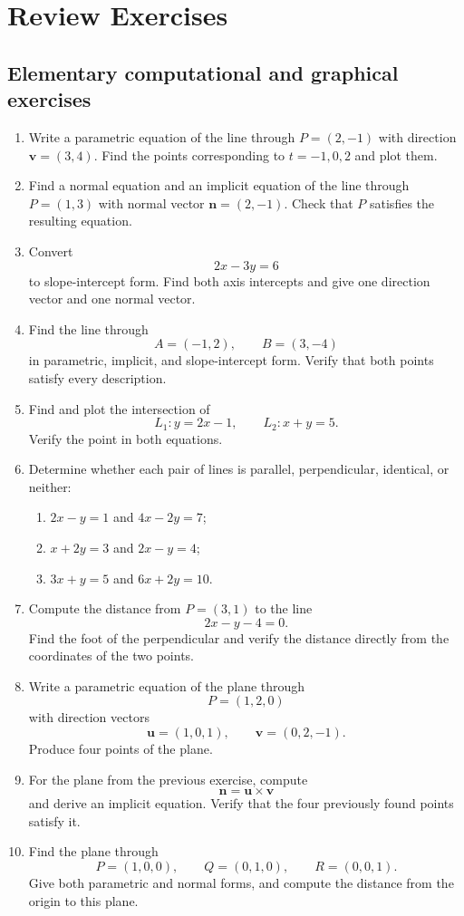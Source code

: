 \section{Review Exercises}

\subsection{Elementary computational and graphical exercises}

\begin{enumerate}

\item Write a parametric equation of the line through $P=(2,-1)$ with direction
$\mathbf v=(3,4)$. Find the points corresponding to $t=-1,0,2$ and plot them.

\item Find a normal equation and an implicit equation of the line through
$P=(1,3)$ with normal vector $\mathbf n=(2,-1)$. Check that $P$ satisfies the
resulting equation.

\item Convert
\[
2x-3y=6
\]
to slope-intercept form. Find both axis intercepts and give one direction
vector and one normal vector.

\item Find the line through
\[
A=(-1,2),\qquad B=(3,-4)
\]
in parametric, implicit, and slope-intercept form. Verify that both points
satisfy every description.

\item Find and plot the intersection of
\[
L_1:y=2x-1,
\qquad
L_2:x+y=5.
\]
Verify the point in both equations.

\item Determine whether each pair of lines is parallel, perpendicular,
identical, or neither:
\begin{enumerate}
\item $2x-y=1$ and $4x-2y=7$;
\item $x+2y=3$ and $2x-y=4$;
\item $3x+y=5$ and $6x+2y=10$.
\end{enumerate}

\item Compute the distance from $P=(3,1)$ to the line
\[
2x-y-4=0.
\]
Find the foot of the perpendicular and verify the distance directly from the
coordinates of the two points.

\item Write a parametric equation of the plane through
\[
P=(1,2,0)
\]
with direction vectors
\[
\mathbf u=(1,0,1),\qquad \mathbf v=(0,2,-1).
\]
Produce four points of the plane.

\item For the plane from the previous exercise, compute
\[
\mathbf n=\mathbf u\times\mathbf v
\]
and derive an implicit equation. Verify that the four previously found points
satisfy it.

\item Find the plane through
\[
P=(1,0,0),\qquad Q=(0,1,0),\qquad R=(0,0,1).
\]
Give both parametric and normal forms, and compute the distance from the origin
to this plane.

\end{enumerate}

